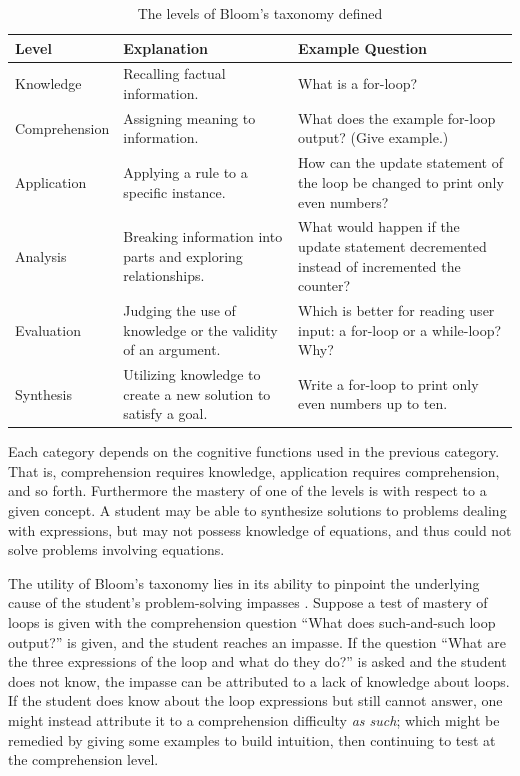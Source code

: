 \begin{table}
\label{tab:bloom}
\caption{The levels of Bloom's taxonomy defined}
\vspace{12pt}
\begin{tabularx}{\textwidth}{||l|X|X||}
\hline \hline
\rowcolor{Gray}
Level &  Explanation & Example Question \\\hline
Knowledge & Recalling factual information.   
& {What is a for-loop?}
\\ \hline
Comprehension & Assigning meaning to information.   
& {What does the example for-loop output? (Give example.)}
\\ \hline
Application & Applying a rule to a specific instance.   
& {How can the update statement of the loop be changed to print 
only even numbers?}
\\ \hline
Analysis 
& Breaking information into parts and exploring relationships.   
& {What would happen if the update statement decremented instead of incremented the counter?}
\\ \hline
Evaluation 
& Judging the use of knowledge or the validity of an
argument.   
& {Which is better for reading user input: a for-loop or a
while-loop? Why?} 
\\ \hline
Synthesis 
& Utilizing knowledge to create a new solution to
satisfy a goal.   
& {Write a for-loop to print only even numbers up to ten.}
\\ \hline \hline 
\end{tabularx}
\vspace{36pt}
\end{table}

Each category depends on the cognitive functions used in the previous category.
That is, comprehension requires knowledge, application requires comprehension,
and so forth.  Furthermore the mastery of one of the levels is with respect to
a given concept.  A student may be able to synthesize solutions to problems
dealing with expressions, but may not possess knowledge of equations, and thus
could not solve problems involving equations.

The utility of Bloom's taxonomy lies in its ability to pinpoint the underlying
cause of the student's problem-solving impasses \cite{shuhidan2011}.  Suppose a
test of mastery of loops is given with the comprehension question ``What does
such-and-such loop output?'' is given, and the student reaches an impasse.  If
the question ``What are the three expressions of the loop and what do they
do?'' is asked and the student does not know, the impasse can be attributed to
a lack of knowledge about loops.  If the student does know about the loop
expressions but still cannot answer, one might instead attribute it to a
comprehension difficulty \emph{as such}; which might be remedied by giving some
examples to build intuition, then continuing to test at the comprehension
level.

